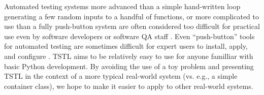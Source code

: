 Automated testing systems more advanced than a simple hand-written
loop generating a few random inputs to a handful of functions, or more
complicated to use than a fully push-button system are often
considered too difficult for practical use even by software developers
or software QA staff \cite{ISSRE12}. Even ``push-button'' tools for
automated testing are sometimes difficult for expert users to install,
apply, and configure \cite{AMAI,CFV08,ISSRE12}.  TSTL aims to be
relatively easy to use for anyone familliar with basic Python
development.  By avoiding the use of a toy problem and presenting TSTL
in the context of a more typical real-world system (vs. e.g., a simple
container class), we hope to make it easier to apply to other
real-world systems.



